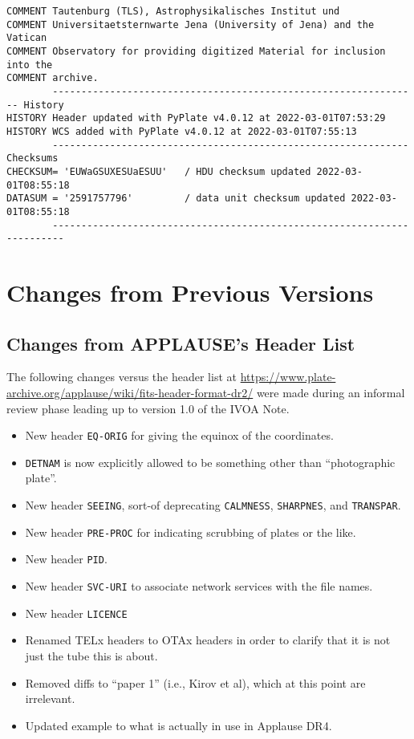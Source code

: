 \documentclass[11pt]{ivoa}
\newcommand\cardname[1]{\texttt{\color{keyword}#1}}
\begin{document}
\begin{lstlisting}
COMMENT Tautenburg (TLS), Astrophysikalisches Institut und
COMMENT Universitaetsternwarte Jena (University of Jena) and the Vatican
COMMENT Observatory for providing digitized Material for inclusion into the
COMMENT archive.
        ---------------------------------------------------------------- History
HISTORY Header updated with PyPlate v4.0.12 at 2022-03-01T07:53:29
HISTORY WCS added with PyPlate v4.0.12 at 2022-03-01T07:55:13
        -------------------------------------------------------------- Checksums
CHECKSUM= 'EUWaGSUXESUaESUU'   / HDU checksum updated 2022-03-01T08:55:18
DATASUM = '2591757796'         / data unit checksum updated 2022-03-01T08:55:18
        ------------------------------------------------------------------------
\end{lstlisting}


\appendix
\section{Changes from Previous Versions}

\subsection{Changes from APPLAUSE's Header List}

The following changes versus the header list at 
\url{https://www.plate-archive.org/applause/wiki/fits-header-format-dr2/}
were made during an informal review phase leading
up to version 1.0 of the IVOA Note.

\begin{itemize}
\item New header \cardname{EQ-ORIG} for giving the equinox of the
coordinates.
\item \cardname{DETNAM} is now explicitly allowed to be something other
than ``photographic plate''.
\item New header \cardname{SEEING}, sort-of deprecating
\cardname{CALMNESS}, \cardname{SHARPNES}, and \cardname{TRANSPAR}.
\item New header \cardname{PRE-PROC} for indicating scrubbing of plates
or the like.
\item New header \cardname{PID}.
\item New header \cardname{SVC-URI} to associate network services with
the file names.
\item New header \cardname{LICENCE}
\item Renamed TELx headers to OTAx headers in order to clarify that it
is not just the tube this is about.
\item Removed diffs to ``paper 1'' (i.e., Kirov et al), which at
this point are irrelevant.
\item Updated example to what is actually in use in Applause DR4.
\end{itemize}


\end{document}
